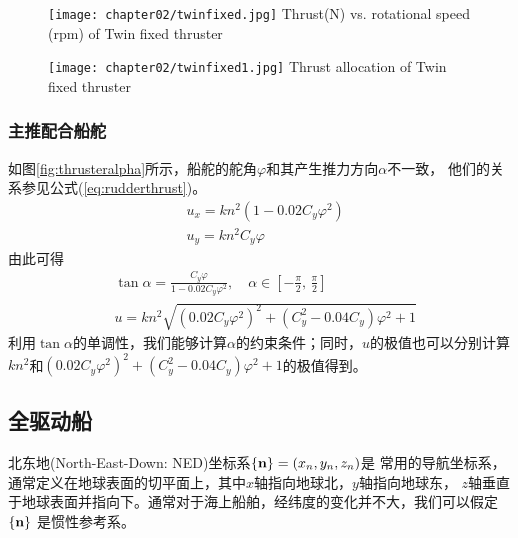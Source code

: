 \begin{figure}[!htp]
  \centering
  \texttt{[image: chapter02/twinfixed.jpg]}
    {Thrust(N) vs. rotational speed (rpm) of Twin fixed thruster}
  \label{fig:twinfixed}
\end{figure}

\begin{figure}[!htp]
  \centering
  \texttt{[image: chapter02/twinfixed1.jpg]}
    {Thrust allocation of Twin fixed thruster}
  \label{fig:twinfixed1}
\end{figure}

\subsubsection{主推配合船舵}
如图\ref{fig:thrusteralpha}所示，船舵的舵角$\varphi$和其产生推力方向$\alpha$不一致，
他们的关系参见公式(\ref{eq:rudderthrust})。
\begin{equation}
  \begin{aligned}
    &u_x = k n^2 (1- 0.02 C_y \varphi^2) \\
    &u_y = k n^2 C_y \varphi
  \end{aligned}
\end{equation}
由此可得
\begin{equation}
  \begin{aligned}
    &\tan \alpha = \frac{C_y \varphi}{1- 0.02 C_y \varphi^2},  \quad \alpha \in
    [-\frac{\pi}{2}, \, \frac{\pi}{2}] \\
    &u=kn^2 \sqrt{(0.02C_y\varphi^2)^2+(C_y^2 -0.04 C_y)\varphi^2 +1}
  \end{aligned}
\end{equation}
利用$\tan \alpha$的单调性，我们能够计算$\alpha$的约束条件；同时，$u$的极值也可以分别计算
$kn^2$和$(0.02C_y\varphi^2)^2+(C_y^2 -0.04 C_y)\varphi^2 +1$的极值得到。

\subsection{全驱动船}
北东地(North-East-Down: NED)坐标系$\left\{ \mathbf{n} \right\}=(x_n, y_n, z_n)$是
常用的导航坐标系，通常定义在地球表面的切平面上，其中$x$轴指向地球北，$y$轴指向地球东，
$z$轴垂直于地球表面并指向下。通常对于海上船舶，经纬度的变化并不大，我们可以假定$\left\{ \mathbf{n} \right\}$
是惯性参考系。

